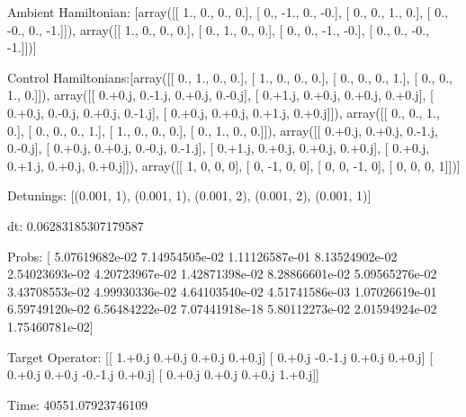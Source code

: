 \documentclass{article}
\begin{document}
    

\newpage

Ambient Hamiltonian: [array([[ 1.,  0.,  0.,  0.],
       [ 0., -1.,  0., -0.],
       [ 0.,  0.,  1.,  0.],
       [ 0., -0.,  0., -1.]]), array([[ 1.,  0.,  0.,  0.],
       [ 0.,  1.,  0.,  0.],
       [ 0.,  0., -1., -0.],
       [ 0.,  0., -0., -1.]])]

Control Hamiltonians:[array([[ 0.,  1.,  0.,  0.],
       [ 1.,  0.,  0.,  0.],
       [ 0.,  0.,  0.,  1.],
       [ 0.,  0.,  1.,  0.]]), array([[ 0.+0.j,  0.-1.j,  0.+0.j,  0.-0.j],
       [ 0.+1.j,  0.+0.j,  0.+0.j,  0.+0.j],
       [ 0.+0.j,  0.-0.j,  0.+0.j,  0.-1.j],
       [ 0.+0.j,  0.+0.j,  0.+1.j,  0.+0.j]]), array([[ 0.,  0.,  1.,  0.],
       [ 0.,  0.,  0.,  1.],
       [ 1.,  0.,  0.,  0.],
       [ 0.,  1.,  0.,  0.]]), array([[ 0.+0.j,  0.+0.j,  0.-1.j,  0.-0.j],
       [ 0.+0.j,  0.+0.j,  0.-0.j,  0.-1.j],
       [ 0.+1.j,  0.+0.j,  0.+0.j,  0.+0.j],
       [ 0.+0.j,  0.+1.j,  0.+0.j,  0.+0.j]]), array([[ 1,  0,  0,  0],
       [ 0, -1,  0,  0],
       [ 0,  0, -1,  0],
       [ 0,  0,  0,  1]])]

Detunings: [(0.001, 1), (0.001, 1), (0.001, 2), (0.001, 2), (0.001, 1)]

 dt: 0.06283185307179587

Probs: [  5.07619682e-02   7.14954505e-02   1.11126587e-01   8.13524902e-02
   2.54023693e-02   4.20723967e-02   1.42871398e-02   8.28866601e-02
   5.09565276e-02   3.43708553e-02   4.99930336e-02   4.64103540e-02
   4.51741586e-03   1.07026619e-01   6.59749120e-02   6.56484222e-02
   7.07441918e-18   5.80112273e-02   2.01594924e-02   1.75460781e-02]

Target Operator: [[ 1.+0.j  0.+0.j  0.+0.j  0.+0.j]
 [ 0.+0.j -0.-1.j  0.+0.j  0.+0.j]
 [ 0.+0.j  0.+0.j -0.-1.j  0.+0.j]
 [ 0.+0.j  0.+0.j  0.+0.j  1.+0.j]]

Time: 40551.07923746109
\end{document}

